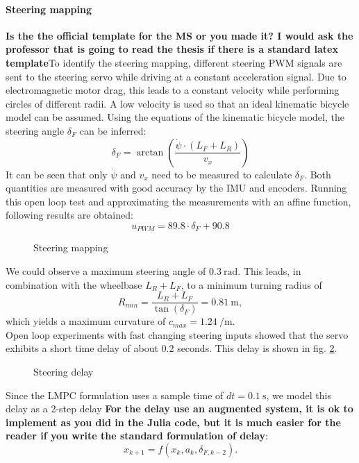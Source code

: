 \paragraph{Steering mapping} {\bfseries{Is the the official template for the MS or you made it? I would ask the professor that is going to read the thesis if there is a standard latex template}}To identify the steering mapping, different steering PWM signals are sent to the steering servo while driving at a constant acceleration signal. Due to electromagnetic motor drag, this leads to a constant velocity while performing circles of different radii. A low velocity is used so that an ideal kinematic bicycle model can be assumed. Using the equations of the kinematic bicycle model, the steering angle $\delta_F$ can be inferred:
\begin{equation}\label{eq:deltaF}
\delta_F = \arctan\left(\frac{\dot\psi\cdot(L_F+L_R)}{v_x}\right)
\end{equation}
It can be seen that only $\dot \psi$ and $v_x$ need to be measured to calculate $\delta_F$. Both quantities are measured with good accuracy by the IMU and encoders.
Running this open loop test and approximating the measurements with an affine function, following results are obtained:
\begin{equation}
u_{PWM} = 89.8\cdot \delta_F + 90.8
\end{equation}
\begin{figure}[ht]
    \centering
  
    \caption{Steering mapping}
    \label{fig:d_f_mapping}
\end{figure}
We could observe a maximum steering angle of $\SI{0.3}{\radian}$. This leads, in combination with the wheelbase $L_R+L_F$, to a minimum turning radius of
\begin{equation}
R_{min} = \frac{L_R+L_F}{\tan(\delta_F)} = \SI{0.81}{\meter},
\end{equation}
which yields a maximum curvature of $c_{max}=\SI{1.24}{\per\meter}$.\\
Open loop experiments with fast changing steering inputs showed that the servo exhibits a short time delay of about 0.2 seconds. This delay is shown in fig. \ref{fig:d_f_delay}.
\begin{figure}[ht]
    \centering
      
    \caption{Steering delay}
    \label{fig:d_f_delay}
\end{figure}
Since the LMPC formulation uses a sample time of $dt=\SI{0.1}{\second}$, we model this delay as a 2-step delay {\bfseries{For the delay use an augmented system, it is ok to implement as you did in the Julia code, but it is much easier for the reader if you write the standard formulation of delay}}:
\begin{equation}
x_{k+1}=f(x_k,a_k,\delta_{F,k-2}).
\end{equation}
